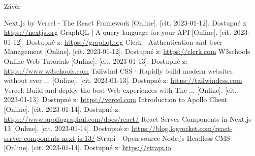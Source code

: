 \documentclass[12pt, a4paper,
oneside,      %
openright
]{report}
\let\oldchapter\chapter
\renewcommand{\chapter}{
	\clearpage %
	\pagestyle{plain} %
	\oldchapter	
}
\begin{document}
	Závěr
	\renewcommand{\bibname}{Seznam použitých zdrojů}
	\begin{thebibliography}{99}
		Next.js by Vercel - The React Framework [Online]. [cit. 2023-01-12]. Dostupné z: \url{https://nextjs.org}
		GraphQL | A query language for your API [Online]. [cit. 2023-01-12]. Dostupné z: \url{https://graphql.org}
		Clerk | Authentication and User Management [Online]. [cit. 2023-01-12]. Dostupné z: \url{https://clerk.com}
		W3schools Online Web Tutorials [Online]. [cit. 2023-01-13]. Dostupné z: \url{https://www.w3schools.com}
		Tailwind CSS - Rapidly build modern websites without ever ... [Online]. [cit. 2023-01-13]. Dostupné z: \url{https://tailwindcss.com}
		Vercel: Build and deploy the best Web experiences with The ... [Online]. [cit. 2023-01-13]. Dostupné z: \url{https://vercel.com}
		Introduction to Apollo Client [Online]. [cit. 2023-01-14]. Dostupné z: \url{https://www.apollographql.com/docs/react/}
		React Server Components in Next.js 13 [Online]. [cit. 2023-01-14]. Dostupné z: \url{https://blog.logrocket.com/react-server-components-next-js-13/}
		Strapi - Open source Node.js Headless CMS
		 [Online]. [cit. 2023-01-14]. Dostupné z: \url{https://strapi.io}
	\end{thebibliography}
	
	\listoffigures
	
	\appendix %
	
	\titleformat{\chapter}[block]{\scshape\bfseries\LARGE}{Příloha \thechapter}{10pt}{\vspace{0pt}}[\vspace{-22pt}] %
	
	
\end{document}
